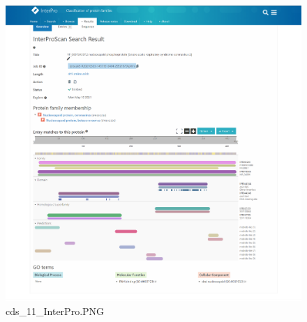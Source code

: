\documentclass[supercite]{HustGraduPaper}
\begin{document}
	\begin{figure}[H]
		\centering
		\includegraphics[width=1\textwidth]{./material/practice2/cds_11/InterPro.png}
		\caption{cds\_11\_InterPro.PNG}
	\end{figure}
\end{document}
